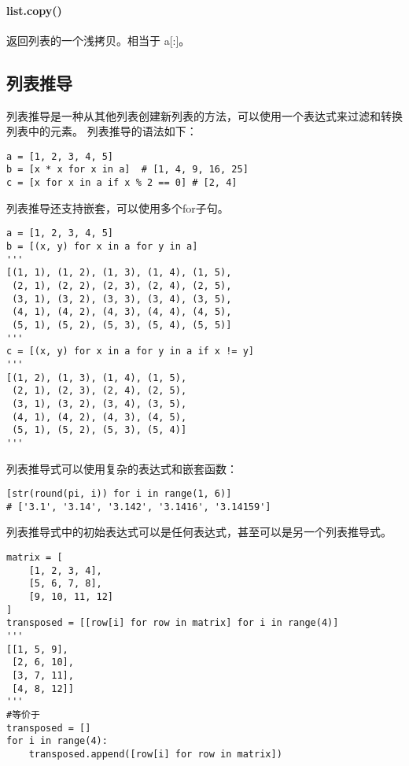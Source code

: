 \documentclass[a4paper, 12pt]{article}
\begin{document}
            \paragraph{list.copy()} 返回列表的一个浅拷贝。相当于 a[:]。
        \subsection{列表推导}
            列表推导是一种从其他列表创建新列表的方法，可以使用一个表达式来过滤和转换列表中的元素。
            列表推导的语法如下：\par
            \begin{listing}[h!]
                \begin{verbatim}
a = [1, 2, 3, 4, 5]
b = [x * x for x in a]  # [1, 4, 9, 16, 25]
c = [x for x in a if x % 2 == 0] # [2, 4]
                \end{verbatim}
            \end{listing}
            列表推导还支持嵌套，可以使用多个for子句。\par
            \begin{listing}[h!]
                \begin{verbatim}
a = [1, 2, 3, 4, 5]
b = [(x, y) for x in a for y in a]
'''
[(1, 1), (1, 2), (1, 3), (1, 4), (1, 5),
 (2, 1), (2, 2), (2, 3), (2, 4), (2, 5),
 (3, 1), (3, 2), (3, 3), (3, 4), (3, 5),
 (4, 1), (4, 2), (4, 3), (4, 4), (4, 5),
 (5, 1), (5, 2), (5, 3), (5, 4), (5, 5)]
'''
c = [(x, y) for x in a for y in a if x != y]
'''
[(1, 2), (1, 3), (1, 4), (1, 5),
 (2, 1), (2, 3), (2, 4), (2, 5),
 (3, 1), (3, 2), (3, 4), (3, 5),
 (4, 1), (4, 2), (4, 3), (4, 5),
 (5, 1), (5, 2), (5, 3), (5, 4)]
'''
                \end{verbatim}
            \end{listing}
            列表推导式可以使用复杂的表达式和嵌套函数：\par
            \begin{listing}[h!]
                \begin{verbatim}
[str(round(pi, i)) for i in range(1, 6)]
# ['3.1', '3.14', '3.142', '3.1416', '3.14159']
                \end{verbatim}
            \end{listing}
            列表推导式中的初始表达式可以是任何表达式，甚至可以是另一个列表推导式。\par
            \begin{listing}[h]
                \begin{verbatim}
matrix = [
    [1, 2, 3, 4],
    [5, 6, 7, 8],
    [9, 10, 11, 12]
]
transposed = [[row[i] for row in matrix] for i in range(4)]
'''
[[1, 5, 9],
 [2, 6, 10],
 [3, 7, 11],
 [4, 8, 12]]
'''
#等价于
transposed = []
for i in range(4):
    transposed.append([row[i] for row in matrix])
                \end{verbatim}
            \end{listing}
\end{document}
